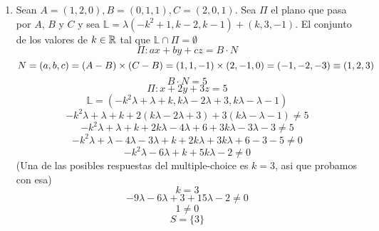 \documentclass[../practica.root.tex]{subfiles}
\begin{document}
\begin{enumerate}
    \item Sean $A = (1,2,0), B = (0,1,1), C = (2,0,1)$. Sea $\Pi$ el plano que pasa por $A$, $B$ y $C$ y sea $\mathbb{L} = \lambda(-k^2 + 1, k - 2, k - 1) + (k, 3, -1)$. El conjunto de los valores de $k \in \mathbb{R}$ tal que $\mathbb{L}\cap\Pi = \emptyset$
          \[ \Pi: ax + by + cz = B\cdot N \]
          \[ N = (a,b,c) = (A-B)\times(C-B) = (1,1,-1)\times(2,-1,0) = (-1,-2,-3) \equiv (1,2,3) \]
          \[ B\cdot N = 5 \]
          \[ \Pi: x + 2y + 3z = 5 \]
          \[ \mathbb{L} = (-k^2\lambda + \lambda + k, k\lambda - 2\lambda + 3, k\lambda - \lambda - 1)  \]
          \[ -k^2\lambda + \lambda + k + 2(k\lambda - 2\lambda + 3) + 3(k\lambda - \lambda - 1) \neq 5 \]
          \[ -k^2\lambda + \lambda + k + 2k\lambda - 4\lambda + 6 + 3k\lambda - 3\lambda - 3 \neq 5 \]
          \[ -k^2\lambda + \lambda - 4\lambda - 3\lambda + k + 2k\lambda + 3k\lambda + 6 - 3 - 5 \neq 0 \]
          \[ -k^2\lambda - 6\lambda + k + 5k\lambda -2 \neq 0 \]
          (Una de las posibles respuestas del multiple-choice es $k = 3$, asi que probamos con esa)
          \[ k = 3 \]
          \[ -9\lambda - 6\lambda + 3 + 15\lambda -2 \neq 0 \]
          \[ 1 \neq 0 \]
          \[ \boxed{S = \{3\}} \]



\end{enumerate}
\end{document}
